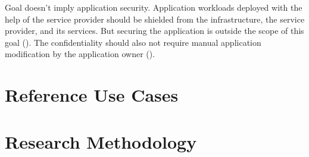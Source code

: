 Goal  doesn't imply application security. Application workloads
deployed with the help of the service provider should be shielded from the
infrastructure, the service provider, and its services. But securing the
application is outside the scope of this goal (). The
confidentiality should also not require manual application modification by the
application owner ().

\section{Reference Use Cases}

\section{Research Methodology}
\label{sec:research-methodology}
